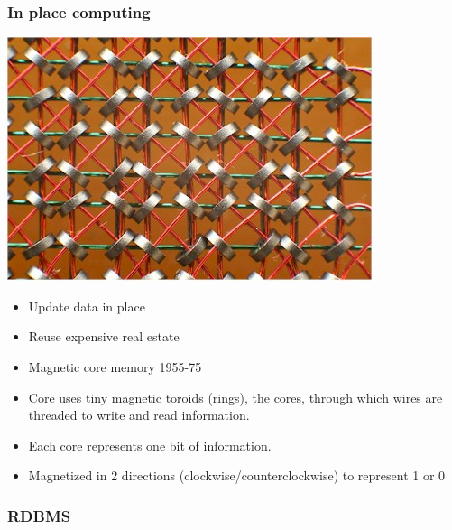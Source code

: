 \documentclass[11pt]{article}
\begin{document}
\subsubsection*{In place computing}
\label{sec:orgheadline9}

\includegraphics[width=.9\linewidth]{./core_memory.jpg}

\begin{itemize}
\item Update data in place
\end{itemize}
\begin{itemize}
\item Reuse expensive real estate
\end{itemize}

\begin{NOTES}
\begin{itemize}
\item Magnetic core memory 1955-75
\item Core uses tiny magnetic toroids (rings), the cores, through which wires are threaded to write and read information.
\item Each core represents one bit of information.
\item Magnetized in 2 directions (clockwise/counterclockwise) to represent 1 or 0
\end{itemize}
\end{NOTES}

\subsubsection*{RDBMS}
\label{sec:orgheadline10}
\end{document}
